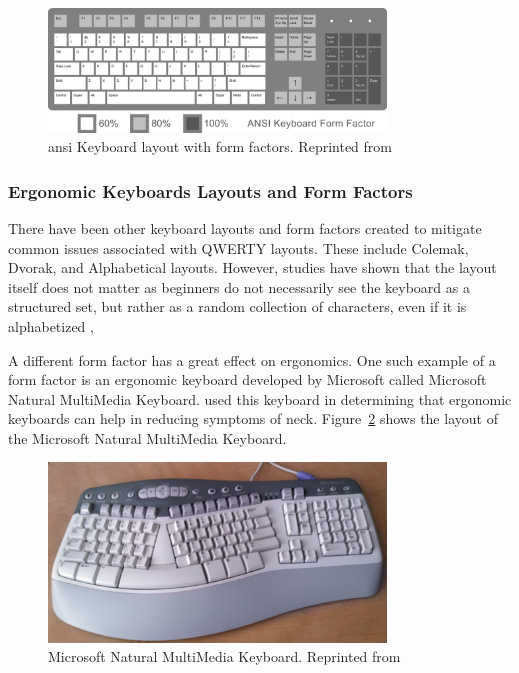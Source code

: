 \documentclass{report}
\begin{document}
\begin{figure}[H]
	\centering
	\includegraphics[width=0.8\textwidth]{ansi.png}
	\caption{\ac{ansi} Keyboard layout with form factors. Reprinted from }
	\label{fig:ansi}
	\centering
\end{figure}

\subsubsection{Ergonomic Keyboards Layouts and Form Factors}

There have been other keyboard layouts and form factors created to mitigate
common issues associated with QWERTY layouts. These include Colemak, Dvorak, and
Alphabetical layouts. However, studies have shown that the layout itself does
not matter as beginners do not necessarily see the keyboard as a structured set,
but rather as a random collection of characters, even if it is alphabetized
\parencite{norman1982},

A different form factor has a great effect on ergonomics. One such example of a
form factor is an ergonomic keyboard developed by Microsoft called Microsoft
Natural MultiMedia Keyboard. \citeauthor{ripat2010} used this keyboard in
determining that ergonomic keyboards can help in reducing symptoms of \ac{neck}.
Figure~\ref{fig:mn} shows the layout of the Microsoft Natural MultiMedia
Keyboard.

\begin{figure}[H]
	\centering
	\includegraphics[width=0.8\textwidth]{mn.png}
	\caption{Microsoft Natural MultiMedia Keyboard. Reprinted from }
	\label{fig:mn}
	\centering
\end{figure}
\end{document}
